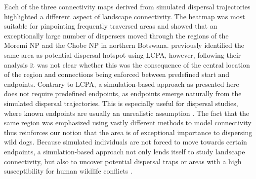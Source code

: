 \documentclass[abstract=on,10pt,a4paper,bibliography=totocnumbered]{article}
\begin{document}
Each of the three connectivity maps derived from simulated dispersal
trajectories highlighted a different aspect of landscape connectivity. The
heatmap was most suitable for pinpointing frequently traversed areas and showed
that an exceptionally large number of dispersers moved through the regions of
the Moremi NP and the Chobe NP in northern Botswana. \cite{Hofmann.2021}
previously identified the same area as potential dispersal hotspot using LCPA,
however, following their analysis it was not clear whether this was the
consequence of the central location of the region and connections being enforced
between predefined start and endpoints. Contrary to LCPA, a simulation-based
approach as presented here does not require predefined endpoints, as endpoints
emerge naturally from the simulated dispersal trajectories. This is especially
useful for dispersal studies, where known endpoints are usually an unrealistic
assumption \citep{Elliot.2014, Abrahms.2017, Cozzi.2020}. The fact that the same
region was emphasized using vastly different methods to model connectivity thus
reinforces our notion that the area is of exceptional importance to dispersing
wild dogs. Because simulated individuals are not forced to move towards certain
endpoints, a simulation-based approach not only lends itself to study landscape
connectivity, but also to uncover potential dispersal traps
\citep{VanDerMeer.2014} or areas with a high susceptibility for human wildlife
conflicts \citep{Cushman.2018}.
\end{document}
